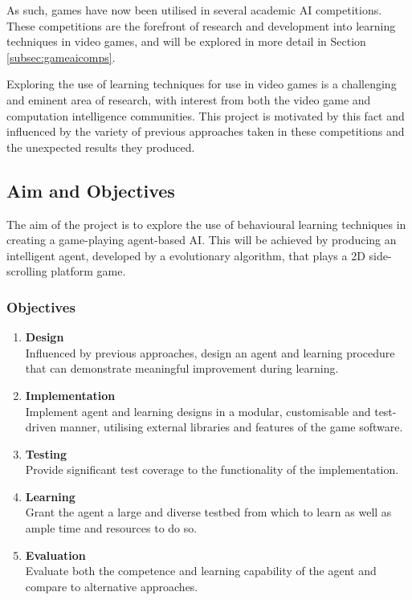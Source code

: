 As such, games have now been utilised in several academic AI competitions. These competitions are the forefront of research and development into learning techniques in video games, and will be explored in more detail in Section \ref{subsec:gameaicomps}.

\vspace{\baselineskip}

Exploring the use of learning techniques for use in video games is a challenging and eminent area of research, with interest from both the video game and computation intelligence communities. This project is motivated by this fact and influenced by the variety of previous approaches taken in these competitions and the unexpected results they produced. 


\subsection{Aim and Objectives}

The aim of the project is to explore the use of behavioural learning techniques in creating a game-playing agent-based AI. This will be achieved by producing an intelligent agent, developed by a evolutionary algorithm, that plays a 2D side-scrolling platform game.

\subsubsection*{Objectives}

\begin{enumerate}

	\item \label{obj:design}
	\textbf{Design} \\
	Influenced by previous approaches, design an agent and learning procedure that can demonstrate meaningful improvement during learning.
	
	\item \label{obj:impl}
	\textbf{Implementation} \\
	Implement agent and learning designs in a modular, customisable and test-driven manner, utilising external libraries and features of the game software.
	
	\item \label{obj:test}
	\textbf{Testing} \\
	Provide significant test coverage to the functionality of the implementation.
	
	\item \label{obj:learn}
	\textbf{Learning} \\
	Grant the agent a large and diverse testbed from which to learn as well as ample time and resources to do so.
	
	\item \label{obj:eval}
	\textbf{Evaluation} \\
	Evaluate both the competence and learning capability of the agent and compare to alternative approaches.

\end{enumerate}

